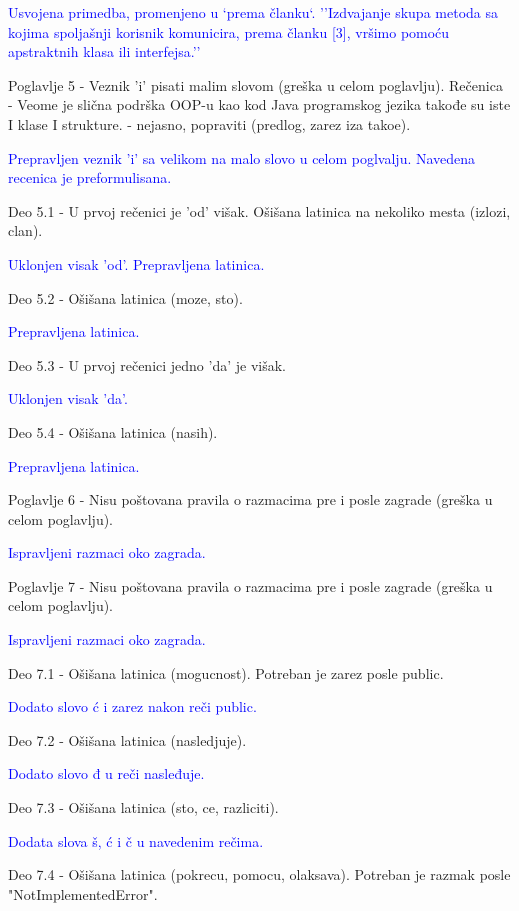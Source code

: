 \documentclass[a4paper]{report}
\newcommand{\odgovor}[1]{\textcolor{blue}{#1}}
\begin{document}
\odgovor{
Usvojena primedba, promenjeno u `prema članku`.  ''Izdvajanje skupa metoda sa kojima spoljašnji korisnik komunicira, prema članku [3], vršimo pomoću apstraktnih klasa ili interfejsa.''
}

Poglavlje 5 - Veznik 'i' pisati malim slovom (gre\v ska u celom poglavlju).
Re\v cenica - Veome je sli\v cna podr\v ska OOP-u kao kod Java programskog jezika takođe su iste I klase I strukture. - nejasno, popraviti (predlog, zarez iza tako\dj{}e).

\odgovor{
Prepravljen veznik 'i' sa velikom na malo slovo u celom poglvalju. Navedena recenica je preformulisana.
}

Deo 5.1 - U prvoj re\v cenici je 'od' vi\v sak. O\v si\v sana latinica na nekoliko mesta (izlozi, clan).

\odgovor{
Uklonjen visak 'od'. Prepravljena latinica.
}

Deo 5.2 - O\v si\v sana latinica (moze, sto).

\odgovor{
Prepravljena latinica.
}

Deo 5.3 - U prvoj re\v cenici jedno 'da' je vi\v sak.

\odgovor{
Uklonjen visak 'da'.
}

Deo 5.4 - O\v si\v sana latinica (nasih).

\odgovor{
Prepravljena latinica.
}

Poglavlje 6 - Nisu po\v stovana pravila o razmacima pre i posle zagrade (gre\v ska u celom poglavlju).

\odgovor{
Ispravljeni razmaci oko zagrada.
}

Poglavlje 7 - Nisu po\v stovana pravila o razmacima pre i posle zagrade (gre\v ska u celom poglavlju).

\odgovor{
Ispravljeni razmaci oko zagrada.
}

Deo 7.1 - O\v si\v sana latinica (mogucnost). Potreban je zarez posle public.

\odgovor{
Dodato slovo ć i zarez nakon reči public.
}

Deo 7.2 - O\v si\v sana latinica (nasledjuje).

\odgovor{
Dodato slovo đ u reči nasleđuje.
}

Deo 7.3 - O\v si\v sana latinica (sto, ce, razliciti).

\odgovor{
Dodata slova š, ć i č u navedenim rečima.
}

Deo 7.4 - O\v si\v sana latinica (pokrecu, pomocu, olaksava). Potreban je razmak posle "NotImplementedError".
\end{document}
